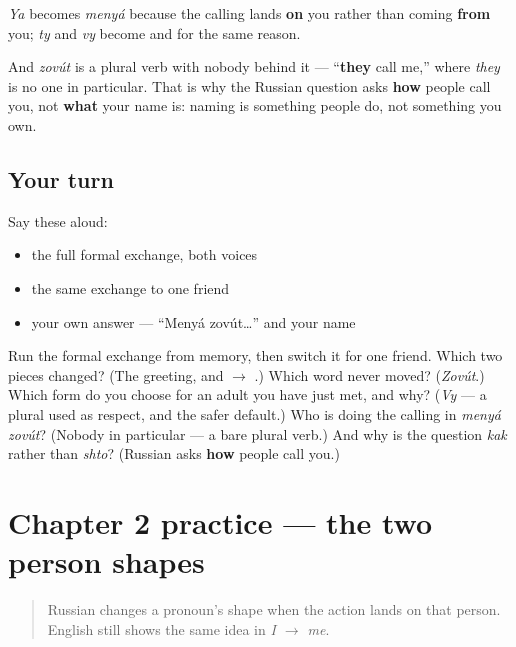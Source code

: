 \begin{grammarlens}[title={Grammar Lens: why the shapes change at all}]
\emph{Ya} becomes \emph{menyá} because the calling lands \textbf{on} you rather than coming \textbf{from} you; \emph{ty} and \emph{vy} become \emph{} and \emph{} for the same reason.

And \emph{zovút} is a plural verb with nobody behind it — \textquotedblleft{}\textbf{they} call me,\textquotedblright{} where \emph{they} is no one in particular. That is why the Russian question asks \textbf{how} people call you, not \textbf{what} your name is: naming is something people do, not something you own.
\end{grammarlens}

\subsection*{Your turn}
Say these aloud:

\begin{itemize}
\raggedright
  \item the full formal exchange, both voices
  \item the same exchange to one friend
  \item your own answer — \textquotedblleft{}Menyá zovút…\textquotedblright{} and your name
\end{itemize}

\begin{tcolorbox}[breakable,colback=teal!4,colframe=teal!35!black,title={Before you move on}]
Run the formal exchange from memory, then switch it for one friend. Which two pieces changed? (The greeting, and \emph{ $\to$ }.) Which word never moved? (\emph{Zovút}.) Which form do you choose for an adult you have just met, and why? (\emph{Vy} — a plural used as respect, and the safer default.) Who is doing the calling in \emph{menyá zovút}? (Nobody in particular — a bare plural verb.) And why is the question \emph{kak} rather than \emph{shto}? (Russian asks \textbf{how} people call you.)
\end{tcolorbox}
\section[Practice]{Chapter 2 practice — the two person shapes}

\label{lesson:RU-C02-practice-cases}



\begin{quote}
Russian changes a pronoun's shape when the action lands on that person. English still shows the same idea in \emph{I $\to$ me}.
\end{quote}

